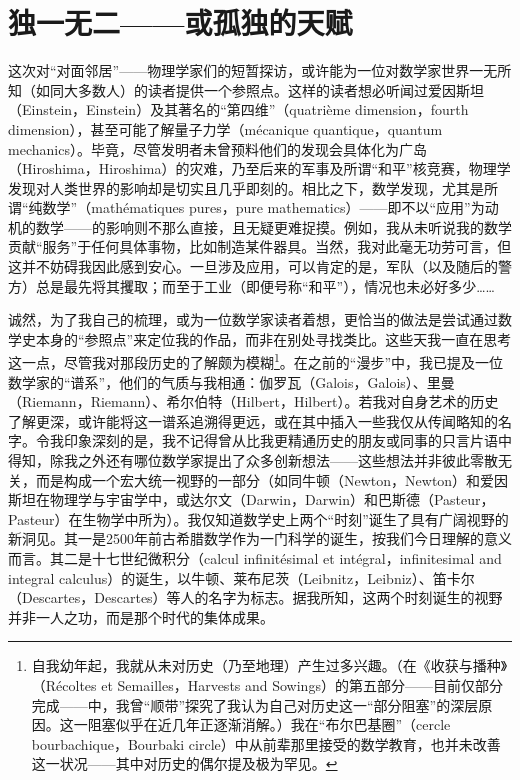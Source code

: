 \section{独一无二——或孤独的天赋}

这次对“对面邻居”——物理学家们的短暂探访，或许能为一位对数学家世界一无所知（如同大多数人）的读者提供一个参照点。这样的读者想必听闻过爱因斯坦（Einstein，Einstein）及其著名的“第四维”（quatrième dimension，fourth dimension），甚至可能了解量子力学（mécanique quantique，quantum mechanics）。毕竟，尽管发明者未曾预料他们的发现会具体化为广岛（Hiroshima，Hiroshima）的灾难，乃至后来的军事及所谓“和平”核竞赛，物理学发现对人类世界的影响却是切实且几乎即刻的。相比之下，数学发现，尤其是所谓“纯数学”（mathématiques pures，pure mathematics）——即不以“应用”为动机的数学——的影响则不那么直接，且无疑更难捉摸。例如，我从未听说我的数学贡献“服务”于任何具体事物，比如制造某件器具。当然，我对此毫无功劳可言，但这并不妨碍我因此感到安心。一旦涉及应用，可以肯定的是，军队（以及随后的警方）总是最先将其攫取；而至于工业（即便号称“和平”），情况也未必好多少……

诚然，为了我自己的梳理，或为一位数学家读者着想，更恰当的做法是尝试通过数学史本身的“参照点”来定位我的作品，而非在别处寻找类比。这些天我一直在思考这一点，尽管我对那段历史的了解颇为模糊\footnote{自我幼年起，我就从未对历史（乃至地理）产生过多兴趣。（在《收获与播种》（Récoltes et Semailles，Harvests and Sowings）的第五部分——目前仅部分完成——中，我曾“顺带”探究了我认为自己对历史这一“部分阻塞”的深层原因。这一阻塞似乎在近几年正逐渐消解。）我在“布尔巴基圈”（cercle bourbachique，Bourbaki circle）中从前辈那里接受的数学教育，也并未改善这一状况——其中对历史的偶尔提及极为罕见。}。在之前的“漫步”中，我已提及一位数学家的“谱系”，他们的气质与我相通：伽罗瓦（Galois，Galois）、里曼（Riemann，Riemann）、希尔伯特（Hilbert，Hilbert）。若我对自身艺术的历史了解更深，或许能将这一谱系追溯得更远，或在其中插入一些我仅从传闻略知的名字。令我印象深刻的是，我不记得曾从比我更精通历史的朋友或同事的只言片语中得知，除我之外还有哪位数学家提出了众多创新想法——这些想法并非彼此零散无关，而是构成一个宏大统一视野的一部分（如同牛顿（Newton，Newton）和爱因斯坦在物理学与宇宙学中，或达尔文（Darwin，Darwin）和巴斯德（Pasteur，Pasteur）在生物学中所为）。我仅知道数学史上两个“时刻”诞生了具有广阔视野的新洞见。其一是2500年前古希腊数学作为一门科学的诞生，按我们今日理解的意义而言。其二是十七世纪微积分（calcul infinitésimal et intégral，infinitesimal and integral calculus）的诞生，以牛顿、莱布尼茨（Leibnitz，Leibniz）、笛卡尔（Descartes，Descartes）等人的名字为标志。据我所知，这两个时刻诞生的视野并非一人之功，而是那个时代的集体成果。

